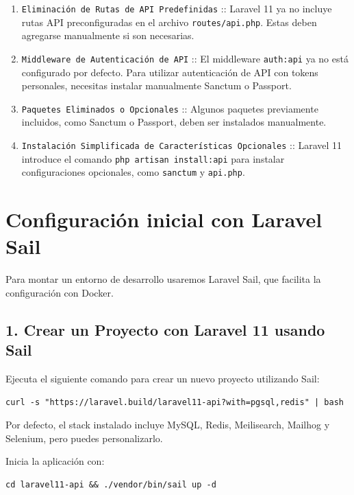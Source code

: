 \documentclass[11pt]{article}
\begin{document}
\begin{enumerate}
\item \texttt{Eliminación de Rutas de API Predefinidas} :: Laravel 11 ya no incluye rutas API preconfiguradas en el archivo \texttt{routes/api.php}. Estas deben agregarse manualmente si son necesarias.

\item \texttt{Middleware de Autenticación de API} :: El middleware \texttt{auth:api} ya no está configurado por defecto. Para utilizar autenticación de API con tokens personales, necesitas instalar manualmente Sanctum o Passport.

\item \texttt{Paquetes Eliminados o Opcionales} :: Algunos paquetes previamente incluidos, como Sanctum o Passport, deben ser instalados manualmente.

\item \texttt{Instalación Simplificada de Características Opcionales} :: Laravel 11 introduce el comando \texttt{php artisan install:api} para instalar configuraciones opcionales, como \texttt{sanctum} y \texttt{api.php}.
\end{enumerate}

\section{Configuración inicial con Laravel Sail}
\label{sec:orgd9ae06c}

Para montar un entorno de desarrollo usaremos Laravel Sail, que facilita la configuración con Docker.

\subsection{1. Crear un Proyecto con Laravel 11 usando Sail}
\label{sec:org3682f47}

Ejecuta el siguiente comando para crear un nuevo proyecto utilizando Sail:

\begin{verbatim}
curl -s "https://laravel.build/laravel11-api?with=pgsql,redis" | bash
\end{verbatim}

Por defecto, el stack instalado incluye MySQL, Redis, Meilisearch, Mailhog y Selenium, pero puedes personalizarlo.

Inicia la aplicación con:

\begin{verbatim}
cd laravel11-api && ./vendor/bin/sail up -d
\end{verbatim}
\end{document}
